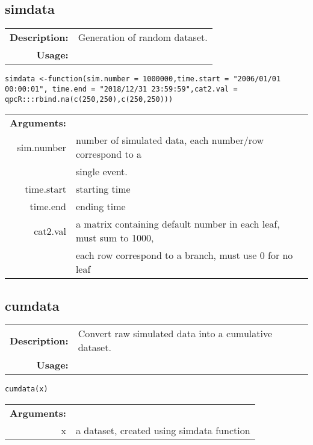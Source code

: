 \subsection{simdata}

\begin{tabular}{rl}
	\textbf{Description:} & Generation of random dataset.  \\
	\textbf{Usage:} &
\end{tabular}

\begin{lstlisting}
simdata <-function(sim.number = 1000000,time.start = "2006/01/01 00:00:01", time.end = "2018/12/31 23:59:59",cat2.val = qpcR:::rbind.na(c(250,250),c(250,250)))

\end{lstlisting}
\begin{tabular}{rl}
	\textbf{Arguments:} &\\
	sim.number & number of simulated data, each number/row correspond to a \\
	& single event.\\
	time.start & starting time\\
	time.end & ending time\\
	cat2.val & a matrix containing default number in each leaf, must sum to 1000, \\
	& each row correspond to a branch, must use 0 for no leaf\\
\end{tabular}

\newpage%

\subsection{cumdata}

\begin{tabular}{rl}
	\textbf{Description:} & Convert raw simulated data into a cumulative dataset.  \\
	\textbf{Usage:} &
\end{tabular}

\begin{lstlisting}
cumdata(x)
\end{lstlisting}

\begin{tabular}{rl}
	\textbf{Arguments:} &\\
	x & a dataset, created using simdata function\\
\end{tabular}    

